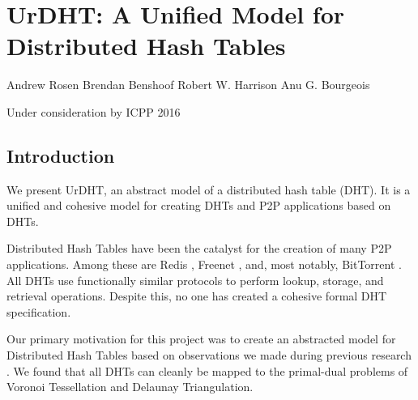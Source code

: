 \chapter{UrDHT: A Unified Model for Distributed Hash Tables}


\begin{center}
Andrew Rosen \qquad Brendan Benshoof \qquad Robert W. Harrison \qquad Anu G. Bourgeois

Under consideration by ICPP 2016
\end{center}



\section{Introduction}





We present UrDHT, an abstract model of a distributed hash table (DHT). %
It is a unified and cohesive model for creating DHTs and P2P applications based on DHTs.
%

Distributed Hash Tables have been the catalyst for the creation of many P2P applications.
Among these are Redis \cite{redis}, Freenet \cite{freenet}, and, most notably, BitTorrent \cite{bittorrent}. 
All DHTs use functionally similar protocols to perform lookup, storage, and retrieval operations.
Despite this, no one has created a cohesive formal DHT specification.

Our primary motivation for this project was to create an abstracted model for Distributed Hash Tables based on observations we made during previous research \cite{dgvh}.
We found that all DHTs can cleanly be mapped to the primal-dual problems of Voronoi Tessellation and Delaunay Triangulation.

